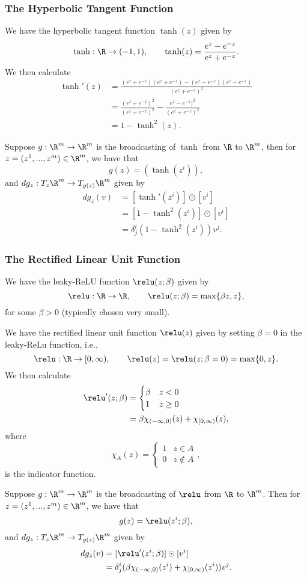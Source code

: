 \subsubsection{The Hyperbolic Tangent Function}
We have the hyperbolic tangent function $\tanh(z)$ given by
$$\tanh:\R\to(-1,1),\qquad\tanh(z)=\frac{e^z-e^{-z}}{e^z+e^{-z}}.$$
We then calculate
\begin{align*}
	\tanh'(z)&=\frac{(e^z+e^{-z})(e^z+e^{-z})-(e^z-e^{-z})(e^z-e^{-z})}{(e^z+e^{-z})^2}\\
	&=\frac{(e^z+e^{-z})^2}{(e^z+e^{-z})^2}-\frac{e^z-e^{-z})^2}{(e^z+e^{-z})^2}\\
	&=1-\tanh^2(z).
\end{align*}

Suppose $g:\R^m\to\R^m$ is the broadcasting of $\tanh$ from $\R$ to $\R^m$, then for $z=(z^1,...,z^m)\in\R^m$, we have that
$$g(z)=(\tanh(z^i)),$$
and $dg_z:T_z\R^m\to T_{g(z)}\R^m$ given by
\begin{align*}
	dg_z(v)&=[\tanh'(z^i)]\odot[v^i]\\
	&=[1-\tanh^2(z^i)]\odot[v^i]\\
	&=\delta^i_j(1-\tanh^2(z^i))v^j.
\end{align*}


\subsubsection{The Rectified Linear Unit Function}
We have the leaky-ReLU function $\relu(z;\beta)$ given by
$$\relu:\R\to\R,\qquad \relu(z;\beta)=\max\{\beta z, z\},$$
for some $\beta>0$ (typically chosen very small).

We have the rectified linear unit function $\relu(z)$ given by setting $\beta=0$ in the leaky-ReLu function, i.e.,
$$\relu:\R\to[0,\infty),\qquad\relu(z)=\relu(z;\beta=0)=\max\{0,z\}.$$
We then calculate
\begin{align*}
	\relu'(z;\beta)&=\begin{cases}
		\beta&z<0\\
		1&z\geq0
	\end{cases}\\
	&=\beta\chi_{(-\infty,0)}(z)+\chi_{[0,\infty)}(z),
\end{align*}
where
$$\chi_A(z)=\begin{cases}
	1&z\in A\\
	0&z\notin A
\end{cases},$$
is the indicator function.

Suppose $g:\R^m\to\R^m$ is the broadcasting of $\relu$ from $\R$ to $\R^m$.   Then for $z=(z^1,...,z^m)\in\R^m$, we have that
$$g(z)=\relu(z^i;\beta),$$
and $dg_z:T_z\R^m\to T_{g(z)}\R^m$ given by
\begin{align*}
	dg_z(v)&=[\relu'(z^i;\beta)]\odot[v^i]\\
	&=\delta^i_j(\beta\chi_{(-\infty,0)}(z^i)+\chi_{[0,\infty)}(z^i))v^j.
\end{align*}


